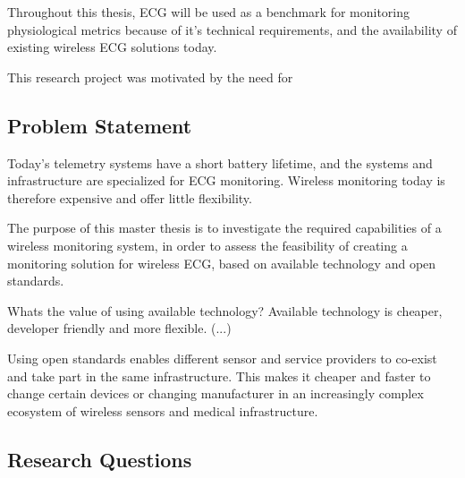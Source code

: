 Throughout this thesis, ECG will be used as a benchmark for monitoring physiological metrics because of it's technical requirements, and the availability of existing wireless ECG solutions today.

This research project was motivated by the need for 

\subsection{Problem Statement} 

\label{sub:problem_statement}

Today's telemetry systems have a short battery lifetime, and the systems and infrastructure are specialized for ECG monitoring. Wireless monitoring today is therefore expensive and offer little flexibility. 

The purpose of this master thesis is to investigate the required capabilities of a wireless monitoring system, in order to assess the feasibility of creating a monitoring solution for wireless ECG, based on available technology and open standards.

Whats the value of using available technology? Available technology is cheaper, developer friendly and more flexible. (...)

Using open standards enables different sensor and service providers to co-exist and take part in the same infrastructure. This makes it cheaper and faster to change certain devices or changing manufacturer in an increasingly complex ecosystem of wireless sensors and medical infrastructure.

\subsection{Research Questions} 

